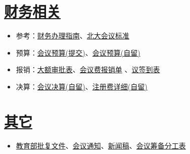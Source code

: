\documentclass[a4,11pt]{article}
\begin{document}
\begin{comment}
\section{\href{run:materials/photos/}{会议照片}}
\begin{itemize}
\item \href{run:materials/photos/training}{培训}：
\item \href{run:materials/photos/workshop}{报告}：\href{run:materials/photos/workshop/1stDay}{第一天}、\href{run:materials/photos/workshop/2ndDay}{第二天}和\href{run:materials/photos/workshop/3rdDay}{第三天}
\item \href{run:materials/photos/banquet}{晚宴}：
\item \href{run:materials/photos/other}{其它}：
\end{itemize}

\end{comment}
\section{\href{run:materials/accounts/}{财务相关}}

\begin{itemize}
\item 参考：\href{materials/accounts/guide.pdf}{财务办理指南}、\href{materials/accounts/standard.pdf}{北大会议标准}
\item 预算：\href{materials/accounts/budget-submit.pdf}{会议预算(提交)}、\href{run:materials/accounts/budget.xls}{会议预算(自留)}
\item 报销：\href{materials/accounts/approval.pdf}{大额审批表}、\href{run:materials/accounts/reimbursement.xlsx}{会议费报销单} 、\href{materials/accounts/signature.pdf}{议签到表}
\item 决算：\href{run:materials/accounts/final.xlsx}{会议决算(自留)}、\href{run:materials/accounts/registration.xlsx}{注册费详细(自留)}
\end{itemize}

\section{\href{run:materials/others/}{其它}}
\begin{itemize}
\item \href{materials/others/approval.pdf}{教育部批复文件}、\href{materials/others/notice.pdf}{会议通知}、\href{materials/others/news.pdf}{新闻稿}、\href{run:materials/others/preparation.xlsx}{会议筹备分工表}
\end{itemize}
\end{document}
